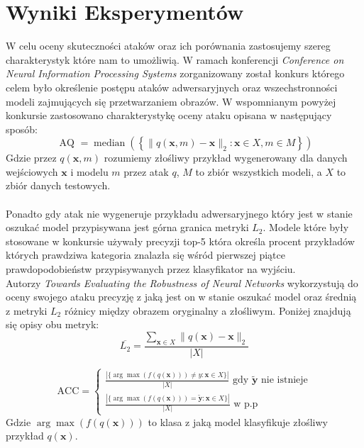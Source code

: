 \documentclass[
    left=2.5cm,         %
    right=2.5cm,        %
    top=2.5cm,          %
    bottom=3cm,         %
    bindingoffset=6mm,  %
    nohyphenation=false %
]{eiti/eiti-thesis}
\renewcommand{\vec}[1]{\mathbf{#1}}
\begin{document}
\section{Wyniki Eksperymentów}\label{comparison}
    W celu oceny skuteczności ataków oraz ich porównania zastosujemy szereg charakterystyk które nam to umożliwią.
    W ramach konferencji
    \textit{Conference on Neural Information Processing Systems} zorganizowany został konkurs którego celem było
    określenie postępu ataków adwersaryjnych oraz wszechstronności modeli zajmujących się przetwarzaniem obrazów\cite{DBLP:journals/corr/abs-1808-01976}.
    W wspomnianym powyżej konkursie zastosowano charakterystykę oceny ataku opisana w następujący sposób:
    \begin{equation}\label{nips_median}
        \text { AQ }=\operatorname{median}\left(\left\{\|q{(\vec{x}, m)} - \vec{x} \|_2 : \vec{x} \in X, m \in M\right\}\right)
    \end{equation}
    Gdzie przez \(q(\vec{x}, m)\) rozumiemy złośliwy przykład wygenerowany dla danych wejściowych \(\vec{x}\) i modelu \(m\) przez atak \(q\),
    \(M\) to zbiór wszystkich modeli, a \(X\) to zbiór danych testowych.
    \\~\\
    Ponadto gdy atak nie wygeneruje przykładu adwersaryjnego który jest w stanie oszukać model przypisywana jest górna granica
    metryki \(L_2\).
    Modele które były stosowane w konkursie używały precyzji top-5 która określa procent przykładów których prawdziwa
    kategoria znalazła się wśród pierwszej piątce prawdopodobieństw przypisywanych przez klasyfikator na wyjściu.\\

    Autorzy \textit{Towards Evaluating the Robustness of Neural Networks}\cite{DBLP:journals/corr/CarliniW16a} wykorzystują do oceny swojego ataku precyzję z jaką jest on w stanie oszukać
    model oraz średnią z metryki \(L_2\) różnicy między obrazem oryginalny a złośliwym. Poniżej znajdują się opisy obu metryk:
    \begin{equation}
        \overline{L_2}=\frac{\sum_{\vec{x} \in X}\|q(\vec{x})-\vec{x}\|_2}{|X|}
    \end{equation}

    \begin{equation}
        \text{ACC}=\left\{
        \begin{array}{lc}
        \frac{|\{ \arg \max (f(q(\vec{x}))) \neq y : \vec{x}\in X\}|}{|X|} \text{ gdy \(\vec{\widetilde{y}}\) nie istnieje}\\
        \frac{|\{\arg \max (f(q(\vec{x}))) =\vec{\widetilde{y}} : \vec{x} \in X\}|}{|X|} \text{ w p.p}
        \end{array}
    \end{equation}
    Gdzie \(\arg \max (f(q(\vec{x})))\) to klasa z jaką model klasyfikuje złośliwy przykład \(q(\vec{x})\).
    \\~\\
\end{document}
